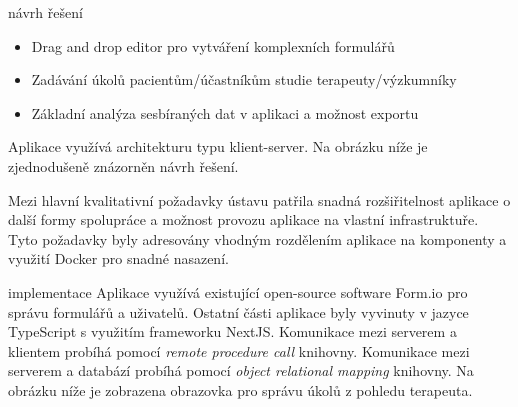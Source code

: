 \documentclass[portrait,a0paper,fontscale=0.25]{baposter}
\begin{document}
\begin{poster}
\begin{posterbox}[column=0, name=goals, below=intro]{návrh řešení}
            \begin{itemize}
                \item Drag and drop editor pro vytváření komplexních formulářů
                \item Zadávání úkolů pacientům/účastníkům studie terapeuty/výzkumníky
                \item Základní analýza sesbíraných dat v aplikaci a možnost exportu
            \end{itemize}

            Aplikace využívá architekturu typu klient-server.
            Na obrázku níže je zjednodušeně znázorněn návrh řešení.

            \begin{center}
                
            \end{center}

            Mezi hlavní kvalitativní požadavky ústavu patřila snadná rozšiřitelnost aplikace o další formy spolupráce a možnost provozu aplikace na vlastní infrastruktuře.
            Tyto požadavky byly adresovány vhodným rozdělením aplikace na komponenty a využití Docker pro snadné nasazení.
        \end{posterbox}

%
%


%
%
%

        \begin{posterbox}[column=1, name=impl]{implementace}
            Aplikace využívá existující open-source software Form.io pro správu formulářů a uživatelů.
            Ostatní části aplikace byly vyvinuty v jazyce TypeScript s využitím frameworku NextJS\@.
            Komunikace mezi serverem a klientem probíhá pomocí \textit{remote procedure call} knihovny.
            Komunikace mezi serverem a databází probíhá pomocí \textit{object relational mapping} knihovny.
            Na obrázku níže je zobrazena obrazovka pro správu úkolů z pohledu terapeuta.


\end{posterbox}
\end{poster}
\end{document}
